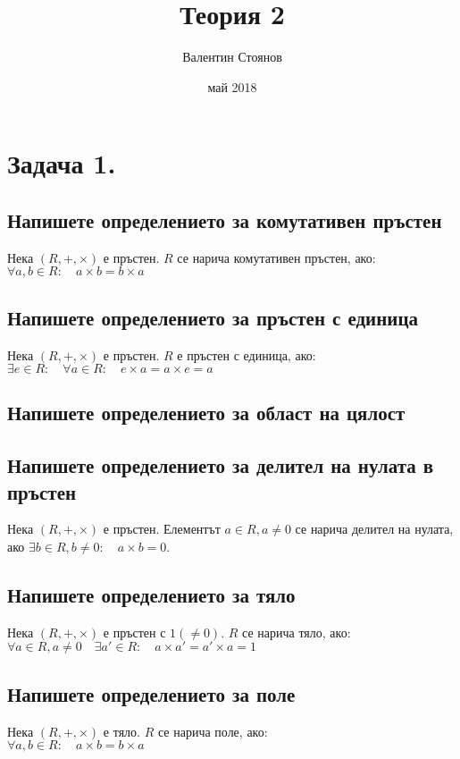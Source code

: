 \documentclass[10pt]{article}
\begin{document}
\title{Теория 2}
\author{Валентин Стоянов}
\date{май 2018}
\maketitle

\section*{Задача 1.}

\subsection*{Напишете определението за комутативен пръстен}
Нека $(R, +, \times)$ е пръстен. $R$ се нарича комутативен пръстен, ако:\\
$\forall a, b \in R: \quad a \times b = b \times a$

\subsection*{Напишете определението за пръстен с единица}
Нека $(R, +, \times)$ е пръстен. $R$ е пръстен с единица, ако:\\
$\exists e \in R: \quad \forall a \in R: \quad e \times a = a \times e = a$

\subsection*{Напишете определението за област на цялост}

\subsection*{Напишете определението за делител на нулата в пръстен}
Нека $(R, +, \times)$ е пръстен. Елементът $a \in R, a \neq 0$ се нарича делител на нулата, ако $\exists b \in R, b \neq 0: \quad a \times b = 0$.

\subsection*{Напишете определението за тяло}
Нека $(R, +, \times)$ е пръстен с $1(\neq 0)$. $R$ се нарича тяло, ако:\\
$\forall a \in R, a \neq 0 \quad \exists a' \in R: \quad a \times a' = a' \times a = 1$

\subsection*{Напишете определението за поле}
Нека $(R, +, \times)$ е тяло. $R$ се нарича поле, ако:\\
$\forall a, b \in R: \quad a \times b = b \times a$
\end{document}
